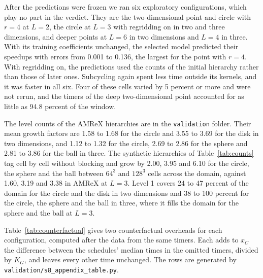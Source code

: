 \documentclass[12pt]{article}
\theoremstyle{remark}
\begin{document}
After the predictions were frozen we ran six exploratory configurations, which play no part in the verdict. They are the two-dimensional point and circle with $r=4$ at $L=2$, the circle at $L=3$ with regridding on in two and three dimensions, and deeper points at $L=6$ in two dimensions and $L=4$ in three. With its training coefficients unchanged, the selected model predicted their speedups with errors from 0.001 to 0.136, the largest for the point with $r=4$. With regridding on, the predictions used the counts of the initial hierarchy rather than those of later ones. Subcycling again spent less time outside its kernels, and it was faster in all six. Four of these cells varied by 5 percent or more and were not rerun, and the timers of the deep two-dimensional point accounted for as little as 94.8 percent of the window.

The level counts of the AMReX hierarchies are in the \texttt{validation} folder. Their mean growth factors are 1.58 to 1.68 for the circle and 3.55 to 3.69 for the disk in two dimensions, and 1.12 to 1.32 for the circle, 2.69 to 2.86 for the sphere and 2.81 to 3.86 for the ball in three. The synthetic hierarchies of Table~\ref{tab:counts} tag cell by cell without blocking and grow by 2.00, 3.95 and 6.10 for the circle, the sphere and the ball between $64^3$ and $128^3$ cells across the domain, against 1.60, 3.19 and 3.38 in AMReX at $L=3$. Level 1 covers 24 to 47 percent of the domain for the circle and the disk in two dimensions and 38 to 100 percent for the circle, the sphere and the ball in three, where it fills the domain for the sphere and the ball at $L=3$.

Table~\ref{tab:counterfactual} gives two counterfactual overheads for each configuration, computed after the data from the same timers. Each adds to $x_C$ the difference between the schedules' median times in the omitted timers, divided by $K_G$, and leaves every other time unchanged. The rows are generated by \texttt{validation/s8\_appendix\_table.py}.
\end{document}
